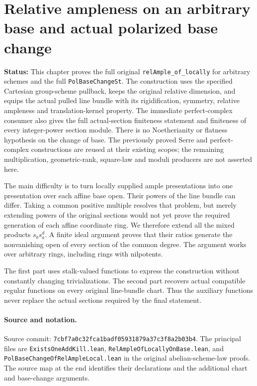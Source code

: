 \documentclass[11pt,a4paper]{article}
\numberwithin{equation}{section}
\theoremstyle{remark}\newtheorem{remark}[theorem]{Remark}
\newcommand{\status}[1]{\textbf{Status:} #1}
\begin{document}
\clearpage
\section{Relative ampleness on an arbitrary base and actual polarized base change}
\label{sec:polarized-base-change-v056}

\status{This chapter proves the full original
\texttt{rel\allowbreak Ample\_\allowbreak of\_\allowbreak locally} for arbitrary schemes and the full
\texttt{Pol\allowbreak Base\allowbreak Change\allowbreak St}.  The construction uses the specified Cartesian
group-scheme pullback, keeps the original relative dimension, and equips
the actual pulled line bundle with its rigidification, symmetry,
relative ampleness and translation-kernel property.  The immediate
perfect-complex consumer also gives the full actual-section
finiteness statement and finiteness of every integer-power section
module.  There is no
Noetherianity or flatness hypothesis on the change of base.
The previously proved Serre and perfect-complex constructions are
reused at their existing scopes; the remaining multiplication,
geometric-rank, square-law and moduli producers are not asserted here.}

The main difficulty is to turn locally supplied ample presentations into
one presentation over each affine base open.  Their powers of the line
bundle can differ.  Taking a common positive multiple resolves that
problem, but merely extending powers of the original sections would
not yet prove the required generation of each affine coordinate ring.
We therefore extend all the mixed products
$s_b s_a^d$.  A finite ideal argument proves that their ratios generate
the nonvanishing open of every section of the common degree.
The argument works over arbitrary rings, including rings with
nilpotents.

The first part uses stalk-valued functions to express the construction
without constantly changing trivializations.  The second part recovers
actual compatible regular functions on every original line-bundle
chart.  Thus the auxiliary functions never replace the actual sections
required by the final statement.

\paragraph{Source and notation.}
Source commit:
\texttt{7cbf7a0c32fca1badf05931879a37c3f8a2b03b4}.
The principal files are
\texttt{Exists\allowbreak One\allowbreak Add\allowbreak Kill.\allowbreak lean},
\texttt{Rel\allowbreak Ample\allowbreak Of\allowbreak Locally\allowbreak On\allowbreak Base.\allowbreak lean}, and
\texttt{Pol\allowbreak Base\allowbreak Change\allowbreak Of\allowbreak Rel\allowbreak Ample\allowbreak Local.\allowbreak lean} in the original
abelian-scheme-law proofs.  The source map at the end identifies their
declarations and the additional chart and base-change arguments.
\end{document}
